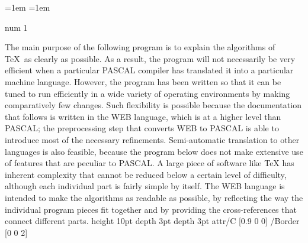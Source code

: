 \pdfthreadhoffset=1em   %
\pdfthreadvoffset=1em   %

\pdfthread              %
   num 1               %

The main purpose of the following program is to explain the algorithms of \TeX\ 
as clearly as possible. As a result, the program will not necessarily be very
efficient when a particular PASCAL compiler has translated it into a
particular machine language. However, the program has been written so that it
can be tuned to run efficiently in a wide variety of operating environments by
making comparatively few changes. Such flexibility is possible because the
documentation that follows is written in the WEB language, which is at a
higher level than PASCAL; the preprocessing step that converts WEB to PASCAL
is able to introduce most of the necessary refinements.
Semi-automatic translation to other languages is also feasible, because the
program below does not make extensive use of features that are peculiar to
PASCAL. A large piece of software like TeX has inherent complexity that cannot
be reduced below a certain level of difficulty, although each individual
part is fairly simple by itself. The WEB language is intended to make
the algorithms as readable as possible, by reflecting the way the
individual program pieces fit together and by providing the
cross-references that connect different parts.
\pdfannotlink           %
    height 10pt         %
    depth 3pt           %
    depth 3pt           %
    attr{/C [0.9 0 0]   %
    /Border [0 0 2]}    %
